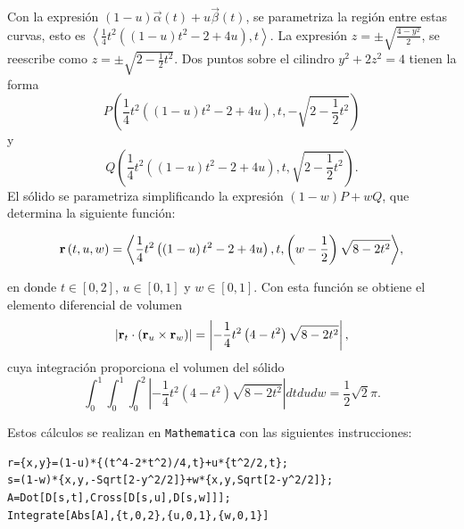 Con la expresión {\small $\left( 1-u\right) \overrightarrow{\alpha }(t)+u\overrightarrow{\beta }(t)$,}
se parametriza la región entre estas curvas, esto es {\small $\left\langle \frac{1}{4}t^2\left( \left(1-u\right)t^2-2+4u\right) ,t\right\rangle$.}
La expresión {\small $z=\pm \sqrt{\frac{4-y^2}{2}}$,} se reescribe como {\small $z=\pm \sqrt{2-\frac{1}{2}t^2}$.}
Dos puntos sobre el cilindro $y^2+2z^2=4$ tienen la forma
\[P\left( \frac{1}{4}t^2\left( \left( 1-u\right) t^2-2+4u\right) ,t,-\sqrt{2-\frac{1}{2}t^2}\right)\]
y \[Q\left( \frac{1}{4}t^2\left( \left(1-u\right) t^2-2+4u\right) ,t,\sqrt{2-\frac{1}{2}t^2}\right)\!.\]
El sólido se parametriza simplificando la expresión $(1-w)P+wQ$, que determina la siguiente función:

\begin{equation*}
{\bf r}\left( t,u,w\right) = \left\langle \frac{1}{4}t^2\left( \left( 1-u\right)
t^2-2+4u\right) ,t,\left( w-\frac{1}{2}\right) \sqrt{8-2t^2}\right\rangle\!,
\end{equation*}

en donde $t\in [0,2]$, $u\in [0,1]$ y $w\in [0,1]$. %
Con esta función se obtiene el elemento diferencial de volumen
%
\[\left| {\bf r}_{t}\cdot \left({\bf r}_{u}\times {\bf r}_{w}\right) \right| =\left| -\frac{1}{4}t^2\left( 4-t^2\right) \sqrt{8-2t^2}\right|,\]
%
cuya integración proporciona el volumen del sólido
%
\[\int_{0}^{1}\int_{0}^{1}\int_{0}^2\left| -\frac{1}{4}t^2\left( 4-t^2\right) \sqrt{8-2t^2}\right|dtdudw= \frac{1}{2}\sqrt{2}\pi.\]
%

Estos cálculos se realizan en \verb"Mathematica" con las siguientes instrucciones:

\begin{tcolorbox}[title=\bf Instrucción en \verb"Mathematica"]\begin{Verbatim}[formatcom=\letraverbatim]
r={x,y}=(1-u)*{(t^4-2*t^2)/4,t}+u*{t^2/2,t};
s=(1-w)*{x,y,-Sqrt[2-y^2/2]}+w*{x,y,Sqrt[2-y^2/2]};
A=Dot[D[s,t],Cross[D[s,u],D[s,w]]];
Integrate[Abs[A],{t,0,2},{u,0,1},{w,0,1}]
\end{Verbatim}
\end{tcolorbox}

